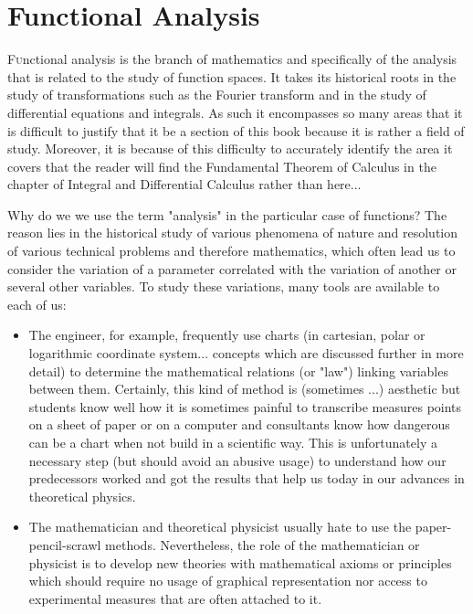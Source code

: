 	\newpage
	\thispagestyle{empty}
	\mbox{}
	\section{Functional Analysis}
	
\lettrine[lines=4]{\color{BrickRed}F}unctional analysis is the branch of mathematics and specifically of the analysis that is related to the study of function spaces. It takes its historical roots in the study of transformations such as the Fourier transform and in the study of differential equations and integrals. As such it encompasses so many areas that it is difficult to justify that it be a section of this book because it is rather a field of study. Moreover, it is because of this difficulty to accurately identify the area it covers that the reader will find the Fundamental Theorem of Calculus in the chapter of Integral and Differential Calculus rather than here...

Why do we we use the term "analysis" in the particular case of functions? The reason lies in the historical study of various phenomena of nature and resolution of various technical problems and therefore mathematics, which often lead us to consider the variation of a parameter correlated with the variation of another or several other variables. To study these variations, many tools are available to each of us:

\begin{itemize}
	\item The engineer, for example, frequently use charts (in cartesian, polar or logarithmic coordinate system... concepts which are discussed further in more detail) to determine the mathematical relations (or "law") linking variables between them. Certainly, this kind of method is (sometimes ...) aesthetic but students know well how it is sometimes painful to transcribe measures points on a sheet of paper or on a computer and consultants know how dangerous can be a chart when not build in a scientific way. This is unfortunately a necessary step (but should avoid an abusive usage) to understand how our predecessors worked and got the results that help us today in our advances in theoretical physics.
	\item The mathematician and theoretical physicist usually hate to use the paper-pencil-scrawl methods. Nevertheless, the role of the mathematician or physicist is to develop new theories with mathematical axioms or principles which should require no usage of graphical representation nor access to experimental  measures that are often attached to it.
\end{itemize}

